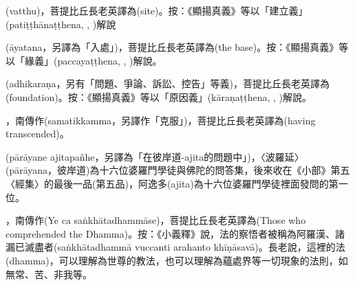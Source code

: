\startitemgroup[noteitems]
\item{}(vatthu)，菩提比丘長老英譯為(site)。按：《顯揚真義》等以「建立義」(patiṭṭhānaṭṭhena, , )解說
\stopitemgroup

\startitemgroup[noteitems]
\item{}(āyatana，另譯為「入處」)，菩提比丘長老英譯為(the base)。按：《顯揚真義》等以「緣義」(paccayaṭṭhena, , )解說。
\stopitemgroup

\startitemgroup[noteitems]
\item{}(adhikaraṇa，另有「問題、爭論、訴訟、控告」等義)，菩提比丘長老英譯為(foundation)。按：《顯揚真義》等以「原因義」(kāraṇaṭṭhena, , )解說。
\stopitemgroup

\startitemgroup[noteitems]
\item{}，南傳作(samatikkamma，另譯作「克服」)，菩提比丘長老英譯為(having transcended)。
\stopitemgroup

\startitemgroup[noteitems]
\item{}(pārāyane ajitapañhe，另譯為「在彼岸道-ajita的問題中」)，〈波羅延〉(pārāyana，彼岸道)為十六位婆羅門學徒與佛陀的問答集，後來收在《小部》第五〈經集〉的最後一品(第五品)，阿逸多(ajita)為十六位婆羅門學徒裡面發問的第一位。
\stopitemgroup

\startitemgroup[noteitems]
\item{}，南傳作(Ye ca saṅkhātadhammāse)，菩提比丘長老英譯為(Those who comprehended the Dhamma)。按：《小義釋》說，法的察悟者被稱為阿羅漢、諸漏已滅盡者(saṅkhātadhammā vuccanti arahanto khīṇāsavā)。長老說，這裡的法(dhamma)，可以理解為世尊的教法，也可以理解為蘊處界等一切現象的法則，如無常、苦、非我等。
\stopitemgroup

